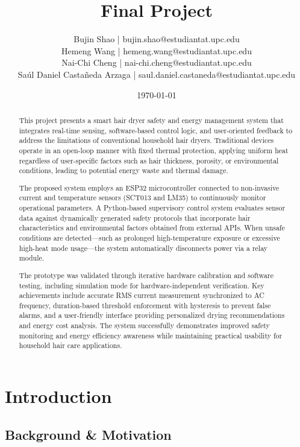 \documentclass[11pt,a4paper]{article}
\title{\textbf{Final Project}}
\author{Bujin Shao | bujin.shao@estudiantat.upc.edu\\Hemeng Wang | hemeng.wang@estudiantat.upc.edu\\Nai-Chi Cheng | nai-chi.cheng@estudiantat.upc.edu \\Saúl Daniel Castañeda Arzaga | saul.daniel.castaneda@estudiantat.upc.edu\\}
\date{\today}
\begin{document}
\maketitle

\begin{abstract}
This project presents a smart hair dryer safety and energy management system that integrates real-time sensing, software-based control logic, and user-oriented feedback to address the limitations of conventional household hair dryers. Traditional devices operate in an open-loop manner with fixed thermal protection, applying uniform heat regardless of user-specific factors such as hair thickness, porosity, or environmental conditions, leading to potential energy waste and thermal damage.

The proposed system employs an ESP32 microcontroller connected to non-invasive current and temperature sensors (SCT013 and LM35) to continuously monitor operational parameters. A Python-based supervisory control system evaluates sensor data against dynamically generated safety protocols that incorporate hair characteristics and environmental factors obtained from external APIs. When unsafe conditions are detected—such as prolonged high-temperature exposure or excessive high-heat mode usage—the system automatically disconnects power via a relay module.

The prototype was validated through iterative hardware calibration and software testing, including simulation mode for hardware-independent verification. Key achievements include accurate RMS current measurement synchronized to AC frequency, duration-based threshold enforcement with hysteresis to prevent false alarms, and a user-friendly interface providing personalized drying recommendations and energy cost analysis. The system successfully demonstrates improved safety monitoring and energy efficiency awareness while maintaining practical usability for household hair care applications.
\end{abstract}
\newpage
\tableofcontents

\newpage
\section{Introduction}

\subsection{Background \& Motivation}
\end{document}
